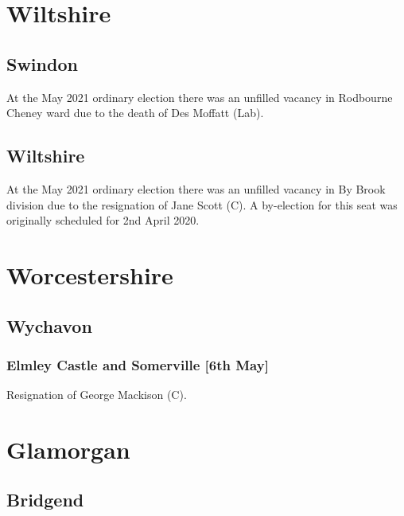 \documentclass[a4paper,openany]{book}
\begin{document}
\begin{resultsiii}
\section{Wiltshire}

\subsection*{Swindon}

At the May 2021 ordinary election there was an unfilled vacancy in Rodbourne Cheney ward due to the death of Des Moffatt (Lab).

\subsection*{Wiltshire}

At the May 2021 ordinary election there was an unfilled vacancy in By Brook division due to the resignation of Jane Scott (C).  A by-election for this seat was originally scheduled for 2nd April 2020.

\section{Worcestershire}

\subsection*{Wychavon}

\subsubsection*{Elmley Castle and Somerville \hspace*{\fill}\nolinebreak[1]%
	\enspace\hspace*{\fill}
	[6th May]}


Resignation of George Mackison (C).

\section{Glamorgan}

\subsection*{Bridgend}


\end{resultsiii}
\end{document}
